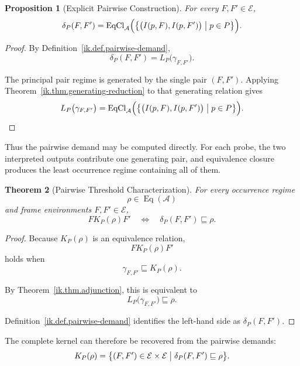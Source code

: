 \documentclass[11pt]{article}
\theoremstyle{plain}
\newtheorem{theorem}{Theorem}[section]
\newtheorem{proposition}[theorem]{Proposition}
\theoremstyle{definition}
\theoremstyle{remark}
\begin{document}
\begin{proposition}[Explicit Pairwise Construction]
  \label{ik.prop.pairwise-explicit}
  For every \(F,F'\in\mathcal{E}\),
  \[
    \delta_P(F,F')
    =
    \operatorname{EqCl}_{\mathcal{A}}
    \Bigl(
    \bigl\{
    \bigl(
    I(p,F),
    I(p,F')
    \bigr)
    \bigm|
    p\in P
    \bigr\}
    \Bigr).
  \]
\end{proposition}

\begin{proof}
  By Definition~\ref{ik.def.pairwise-demand},
  \[
    \delta_P(F,F')
    =
    L_P
    \bigl(
    \gamma_{F,F'}
    \bigr).
  \]

  The principal pair regime
  is generated by the single pair
  \((F,F')\).
  Applying Theorem~\ref{ik.thm.generating-reduction}
  to that generating relation gives
  \[
    L_P
    \bigl(
    \gamma_{F,F'}
    \bigr)
    =
    \operatorname{EqCl}_{\mathcal{A}}
    \Bigl(
    \bigl\{
    \bigl(
    I(p,F),
    I(p,F')
    \bigr)
    \bigm|
    p\in P
    \bigr\}
    \Bigr).
  \]
\end{proof}

Thus the pairwise demand may be computed directly.
For each probe,
the two interpreted outputs contribute one generating pair,
and equivalence closure produces
the least occurrence regime containing all of them.

\begin{theorem}[Pairwise Threshold Characterization]
  \label{ik.thm.pairwise-threshold}
  For every occurrence regime
  \[
    \rho
    \in
    \operatorname{Eq}(\mathcal{A})
  \]
  and frame environments
  \(F,F'\in\mathcal{E}\),
  \[
    F\mathrel{K_P(\rho)}F'
    \quad\Longleftrightarrow\quad
    \delta_P(F,F')
    \sqsubseteq
    \rho.
  \]
\end{theorem}

\begin{proof}
  Because \(K_P(\rho)\)
  is an equivalence relation,
  \[
    F\mathrel{K_P(\rho)}F'
  \]
  holds when
  \[
    \gamma_{F,F'}
    \sqsubseteq
    K_P(\rho).
  \]

  By Theorem~\ref{ik.thm.adjunction},
  this is equivalent to
  \[
    L_P
    \bigl(
    \gamma_{F,F'}
    \bigr)
    \sqsubseteq
    \rho.
  \]

  Definition~\ref{ik.def.pairwise-demand}
  identifies the left-hand side as
  \(\delta_P(F,F')\).
\end{proof}

The complete kernel can therefore be recovered
from the pairwise demands:
\[
  K_P(\rho)
  =
  \bigl\{
  (F,F')
  \in
  \mathcal{E}\times\mathcal{E}
  \bigm|
  \delta_P(F,F')
  \sqsubseteq
  \rho
  \bigr\}.
\]
\end{document}
